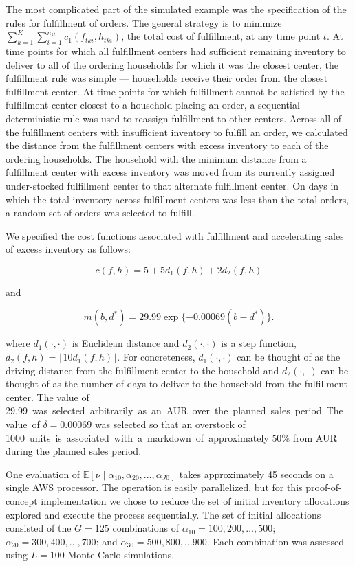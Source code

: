\documentclass[11pt, oneside]{article}   	%
\begin{document}
The most complicated part of the simulated example was the specification of the rules for fulfillment of orders.  The general strategy is to minimize $\sum_{k = 1}^K \sum_{i = 1}^{n_{kt}} c_1 (f_{tki}, h_{tki})$, the total cost of fulfillment, at any time point $t$.  At time points for which all fulfillment centers had sufficient remaining inventory to deliver to all of the ordering households for which it was the closest center, the fulfillment rule was simple --- households receive their order from the closest fulfillment center.  At time points for which fulfillment cannot be satisfied by the fulfillment center closest to a household placing an order, a sequential deterministic rule was used to reassign fulfillment to other centers.  Across all of the fulfillment centers with insufficient inventory to fulfill an order, we calculated the distance from the fulfillment centers with excess inventory to each of the ordering households.  The household with the minimum distance from a fulfillment center with excess inventory was moved from its currently assigned under-stocked fulfillment center to that alternate fulfillment center.  On days in which the total inventory across fulfillment centers was less than the total orders, a random set of orders was selected to fulfill.

We specified the cost functions associated with fulfillment and accelerating sales of excess inventory as follows:

$$c (f, h) = 5 + 5 d_1(f, h) + 2 d_2(f, h)$$

\noindent and

$$m (b, d^*) = 29.99 \exp \{- 0.00069 (b - d^*) \}.$$

\noindent where $d_1(\cdot, \cdot)$ is Euclidean distance and $d_2 (\cdot, \cdot)$ is a step function, $d_2 (f, h) = \lfloor 10 d_1(f, h) \rfloor$.  For concreteness, $d_1(\cdot, \cdot)$ can be thought of as the driving distance from the fulfillment center to the household and $d_2 (\cdot, \cdot)$ can be thought of as the number of days to deliver to the household from the fulfillment center.  The value of \SI{29.99} was selected arbitrarily as an AUR over the planned sales period.  The value of $\delta = 0.00069$ was selected so that an overstock of \SI{1000} units is associated with a markdown of approximately $50\%$ from AUR during the planned sales period.

One evaluation of $\mathbb{E}[\nu \mid \alpha_{10}, \alpha_{20}, \ldots, \alpha_{J0}]$ takes approximately 45 seconds on a single AWS processor.  The operation is easily parallelized, but for this proof-of-concept implementation we chose to reduce the set of initial inventory allocations explored and execute the process sequentially.  The set of initial allocations consisted of the $G = 125$ combinations of $\alpha_{10} = 100, 200, \dots, 500$; $\alpha_{20} = 300, 400, \dots, 700$; and $\alpha_{30} = 500, 800, \ldots 900$.  Each combination was assessed using $L = 100$ Monte Carlo simulations.
\end{document}
